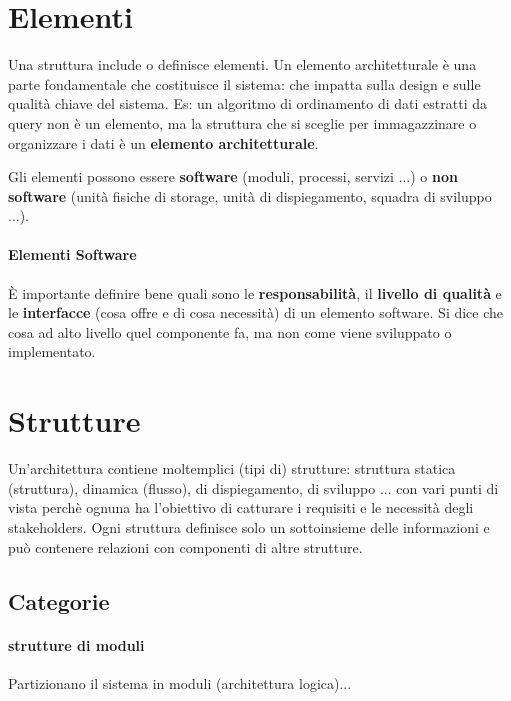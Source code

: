 \section{Elementi}

Una struttura include o definisce elementi. Un elemento architetturale \`e una parte fondamentale che costituisce il sistema: che impatta sulla design e sulle qualit\`a chiave del sistema.
Es: un algoritmo di ordinamento di dati estratti da query non \`e un elemento, ma la struttura che si sceglie per immagazzinare o organizzare i dati \`e un \textbf{elemento architetturale}.

Gli elementi possono essere \textbf{software} (moduli, processi, servizi ...) o \textbf{non software} (unit\`a fisiche di storage, unit\`a di dispiegamento, squadra di sviluppo ...).

\paragraph{Elementi Software}

\`E importante definire bene quali sono le \textbf{responsabilit\`a}, il \textbf{livello di qualit\`a} e le \textbf{interfacce} (cosa offre e di cosa necessit\`a) di un elemento software. Si dice che cosa ad alto livello quel componente fa, ma non come viene sviluppato o implementato.

\section{Strutture}

Un'architettura contiene moltemplici (tipi di) strutture: struttura statica (struttura), dinamica (flusso), di dispiegamento, di sviluppo ... con vari punti di vista perch\`e ognuna ha l'obiettivo di catturare i requisiti e le necessit\`a degli stakeholders.
Ogni struttura definisce solo un sottoinsieme delle informazioni e pu\`o contenere relazioni con componenti di altre strutture.

\subsection{Categorie}

\paragraph{strutture di moduli}

Partizionano il sistema in moduli (architettura logica)...

